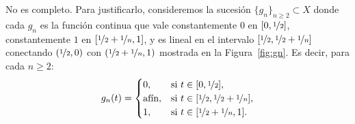 \documentclass[12pt]{article}
\begin{document}
\begin{ejercicio}[2 puntos]
\begin{enumerate}[label=\alph*)]
                No es completo. Para justificarlo, consideremos la sucesión $\{g_n\}_{n\ge 2} \subset X$ donde cada $g_n$ es la función continua que vale constantemente $0$ en $[0, \nicefrac{1}{2}]$, constantemente $1$ en $[\nicefrac{1}{2} + \nicefrac{1}{n}, 1]$, y es lineal en el intervalo $[\nicefrac{1}{2}, \nicefrac{1}{2} + \nicefrac{1}{n}]$ conectando $( \nicefrac{1}{2}, 0 )$ con $( \nicefrac{1}{2} + \nicefrac{1}{n}, 1 )$ mostrada en la Figura~\ref{fig:gn}. Es decir, para cada $n \ge 2$:
                \begin{equation*}
                    g_n(t) = 
                    \begin{cases}
                        0, & \text{si } t \in [0, \nicefrac{1}{2}],\\
                        \text{afín}, & \text{si } t \in [\nicefrac{1}{2}, \nicefrac{1}{2} + \nicefrac{1}{n}],\\
                        1, & \text{si } t \in [\nicefrac{1}{2} + \nicefrac{1}{n}, 1].
                    \end{cases}
                \end{equation*}


\end{enumerate}
\end{ejercicio}
\end{document}
